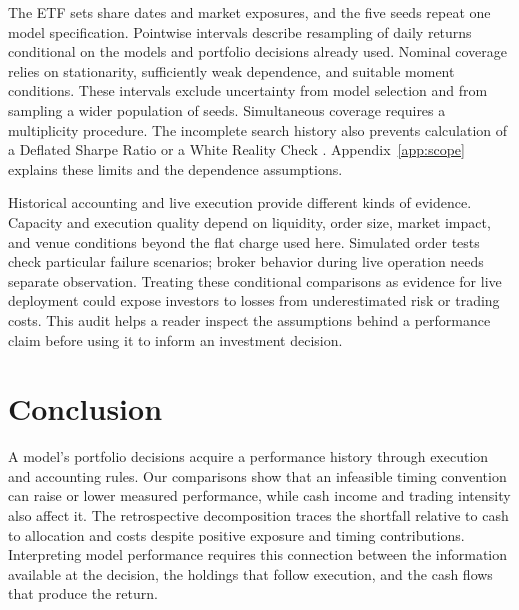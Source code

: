 \documentclass{article}
\newif\ifquantcortexreview
\begin{document}
The ETF sets share dates and market exposures, and the five seeds repeat one model specification. Pointwise intervals describe resampling of daily returns conditional on the models and portfolio decisions already used. Nominal coverage relies on stationarity, sufficiently weak dependence, and suitable moment conditions. These intervals exclude uncertainty from model selection and from sampling a wider population of seeds. Simultaneous coverage requires a multiplicity procedure. The incomplete search history also prevents calculation of a Deflated Sharpe Ratio or a White Reality Check \citep{white2000reality,bailey2014deflated}. Appendix~\ref{app:scope} explains these limits and the dependence assumptions.

Historical accounting and live execution provide different kinds of evidence. Capacity and execution quality depend on liquidity, order size, market impact, and venue conditions beyond the flat charge used here. Simulated order tests check particular failure scenarios; broker behavior during live operation needs separate observation. Treating these conditional comparisons as evidence for live deployment could expose investors to losses from underestimated risk or trading costs. This audit helps a reader inspect the assumptions behind a performance claim before using it to inform an investment decision.

\section{Conclusion}

A model's portfolio decisions acquire a performance history through execution and accounting rules. Our comparisons show that an infeasible timing convention can raise or lower measured performance, while cash income and trading intensity also affect it. The retrospective decomposition traces the shortfall relative to cash to allocation and costs despite positive exposure and timing contributions. Interpreting model performance requires this connection between the information available at the decision, the holdings that follow execution, and the cash flows that produce the return.

\clearpage
\ifquantcortexreview
\begin{ack}
We thank the yfinance contributors for maintaining the software used to retrieve Yahoo Finance price data, and the NumPy, pandas, scikit-learn, and Matplotlib contributors for the analysis and plotting tools. The work had no external funding, and we have no competing interests to disclose.
\end{ack}
\fi
\end{document}
